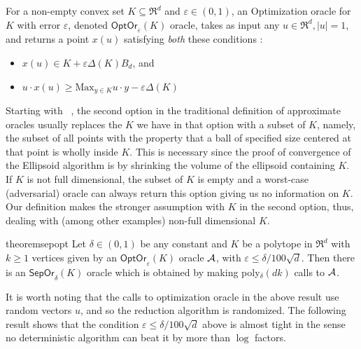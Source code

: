 \documentclass[11pt,letterpaper]{article}
\newcommand{\sep}{{\mathsf{SepOr}}}
\newcommand{\opto}{{\mathsf{OptOr}}}
\begin{document}
\begin{defn}\label{olp}
For a non-empty convex set $K\subseteq \Re^d$ and $\varepsilon\in (0,1)$, an Optimization oracle for $K$ with error $\varepsilon$, denoted $\opto_\varepsilon(K)$ oracle,  takes as input any $u\in \Re^d, |u|=1$, and returns a point $x(u)$ satisfying {\em both} these conditions :
\begin{itemize}
\item $x(u)\in K+\varepsilon\Delta(K)B_d$, and
\item $u\cdot x(u)\geq \mbox{Max}_{y\in K}u\cdot y-\varepsilon\Delta(K)$
\end{itemize}
\end{defn}

\begin{remark}\label{approx-oracles}
Starting with ~\cite{GLS1988}, the second option in the traditional definition of approximate oracles usually replaces the $K$ we have in that option with a subset of $K$, namely, the subset of all points with the property that a ball of specified size centered at that point is wholly inside $K$. This is necessary since the proof of convergence of the Ellipsoid algorithm is by shrinking the volume of the ellipsoid containing $K$.
If $K$ is not full dimensional, the subset of $K$ is empty and a worst-case (adversarial) oracle can always return this option giving us no information on $K$. Our definition makes the stronger assumption  with $K$ in the second option, thus, dealing with (among other examples) non-full dimensional $K$.
\end{remark}

\begin{restatable}{theorem}{sepopt}
\label{thm-sep-to-opt}
Let $\delta \in (0,1)$ be any constant and $K$ be  a polytope in $\Re^d$ with $k\geq 1$ vertices  given by an  $ \opto_\varepsilon(K)$ oracle $\cal A$, with $\varepsilon\leq \delta/100 \sqrt{d}$. Then there is an $\sep_\delta(K)$ oracle which is obtained by making  poly$_\delta (dk)$ calls to $\cal A$. 
\end{restatable}

It is worth noting that the  calls to optimization oracle in the above result use random vectors $u$, and so the reduction algorithm is randomized. The following result shows that the condition $\varepsilon\leq \delta/100 \sqrt{d}$ above is almost tight in the sense no deterministic algorithm can beat it by more than $\log$ factors. 
\end{document}
